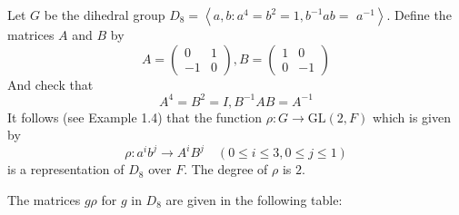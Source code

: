 Let $G$ be the dihedral group $D_8=\left\langle a, b: a^4=b^2=1, b^{-1} a b=\right.$ $\left.a^{-1}\right\rangle$. Define the matrices $A$ and $B$ by
\[
A=\left(\begin{array}{rr}
0 & 1 \\
-1 & 0
\end{array}\right), B=\left(\begin{array}{rr}
1 & 0 \\
0 & -1
\end{array}\right)
\]
And check that
\[
A^4=B^2=I, B^{-1} A B=A^{-1}
\]
It follows (see Example 1.4) that the function $\rho: G \rightarrow \mathrm{GL}(2, F)$ which is given by
\[
\rho: a^i b^j \rightarrow A^i B^j \quad(0 \leqslant i \leqslant 3,0 \leqslant j \leqslant 1)
\]
is a representation of $D_8$ over $F$. The degree of $\rho$ is $2$.

The matrices $g \rho$ for $g$ in $D_8$ are given in the following table:

